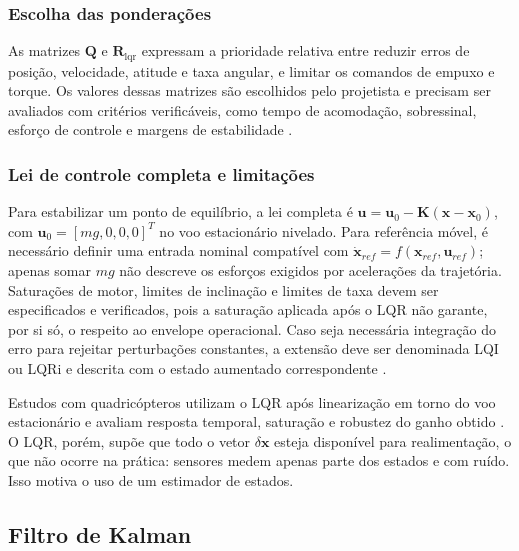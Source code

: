\subsubsection{Escolha das ponderações}

As matrizes $\mathbf{Q}$ e $\mathbf{R}_{\mathrm{lqr}}$ expressam a prioridade relativa entre reduzir erros de posição, velocidade, atitude e taxa angular, e limitar os comandos de empuxo e torque. Os valores dessas matrizes são escolhidos pelo projetista e precisam ser avaliados com critérios verificáveis, como tempo de acomodação, sobressinal, esforço de controle e margens de estabilidade \cite{mathworkslqr}.

\subsubsection{Lei de controle completa e limitações}

Para estabilizar um ponto de equilíbrio, a lei completa é $\mathbf{u}=\mathbf{u}_0-\mathbf{K}(\mathbf{x}-\mathbf{x}_0)$, com $\mathbf{u}_0=[mg,0,0,0]^T$ no voo estacionário nivelado. Para referência móvel, é necessário definir uma entrada nominal compatível com $\dot{\mathbf{x}}_{ref}=f(\mathbf{x}_{ref},\mathbf{u}_{ref})$; apenas somar $mg$ não descreve os esforços exigidos por acelerações da trajetória. Saturações de motor, limites de inclinação e limites de taxa devem ser especificados e verificados, pois a saturação aplicada após o LQR não garante, por si só, o respeito ao envelope operacional. Caso seja necessária integração do erro para rejeitar perturbações constantes, a extensão deve ser denominada LQI ou LQRi e descrita com o estado aumentado correspondente \cite{srivastava2024}.

Estudos com quadricópteros utilizam o LQR após linearização em torno do voo estacionário e avaliam resposta temporal, saturação e robustez do ganho obtido \cite{jafari2010,okyere2019}. O LQR, porém, supõe que todo o vetor $\delta\mathbf{x}$ esteja disponível para realimentação, o que não ocorre na prática: sensores medem apenas parte dos estados e com ruído. Isso motiva o uso de um estimador de estados.

\subsection{Filtro de Kalman}\label{subsec:kalman}

